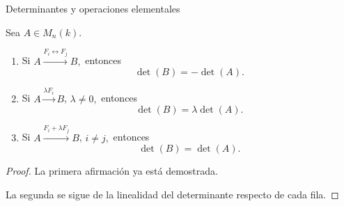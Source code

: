 \begin{frame}[allowframebreaks, t]{Determinantes y operaciones elementales}

\begin{theorem}
Sea \(A\in M_n(k)\).

\begin{enumerate}
\item Si
\(
A\xrightarrow{F_i\leftrightarrow F_j}B,
\)
entonces
\[
\det(B)=-\det(A).
\]

\item Si
\(
A\xrightarrow{\lambda F_i}B\),
\(
\lambda\neq0,
\)
entonces
\[
\det(B)=\lambda\det(A).
\]

\item Si
\(
A\xrightarrow{F_i+\lambda F_j}B\),
\(
i\neq j,
\)
entonces
\[
\det(B)=\det(A).
\]
\end{enumerate}
\end{theorem}

\framebreak 

\begin{proof}
La primera afirmación ya está demostrada.

\medskip

La segunda se sigue de la linealidad del determinante respecto de
cada fila.

\medskip


\end{proof}
\end{frame}

